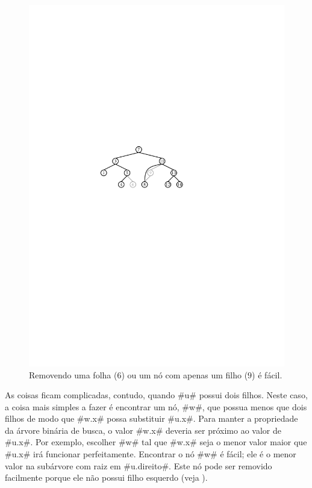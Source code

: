 \begin{figure}
  \begin{center}
    \includegraphics[scale=0.90909]{figs/bst-splice}
  \end{center}
  \caption{Removendo uma folha ($6$) ou um nó com apenas um filho ($9$) é fácil.}
\end{figure}

As coisas ficam complicadas, contudo, quando #u# possui dois filhos. Neste caso, a coisa mais simples a fazer é encontrar um nó, #w#, que possua menos que dois filhos de modo que #w.x# possa substituir #u.x#.  Para manter a propriedade da árvore binária de busca, o valor #w.x# deveria ser próximo ao valor de #u.x#.  Por exemplo, escolher #w# tal que #w.x# seja o menor valor maior que #u.x# irá funcionar perfeitamente.  Encontrar o nó #w# é fácil; ele é o menor valor na subárvore com raiz em #u.direito#.  Este nó pode ser removido facilmente porque ele não possui filho esquerdo (veja ).

